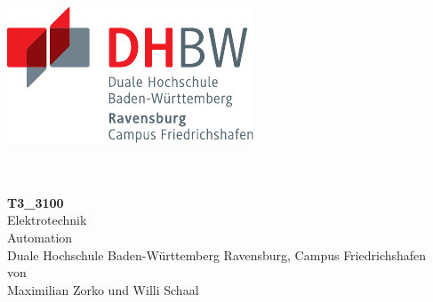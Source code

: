 \documentclass[a4paper, 12pt]{scrartcl}
\begin{document}
	\thispagestyle{plain}
	\hypersetup{pageanchor=false}
	\begin{titlepage}
		\enlargethispage{4.0cm}
		\sffamily 								%
		\parbox{0.5\linewidth}{
			\begin{flushleft}
				\includegraphics[width=0.4\linewidth]{images/DHBW_d_R_FN_46mm_4c.pdf}\\[5ex]
			\end{flushleft}
		}
		
		
		\begin{center}
			
			{\fontsize{20.74pt}{24pt}\selectfont
				\textbf{}\\[1.5ex]}
			{\fontsize{14pt}{17pt}\selectfont
				\textbf{}\\[5ex]}
			{\fontsize{17pt}{20pt}\selectfont
				\textbf{T3\_3100}\\[2ex]}
			{\fontsize{14pt}{17pt}\selectfont
				Elektrotechnik\\[2ex]}
			{\fontsize{12pt}{14pt}\selectfont
				Automation\\[1ex]
				Duale Hochschule Baden-Württemberg Ravensburg, Campus Friedrichshafen\\[5ex]
				von\\[1ex]
				Maximilian Zorko und Willi Schaal\\[15ex]}
			
			
		\end{center}
		

\end{titlepage}
\end{document}
